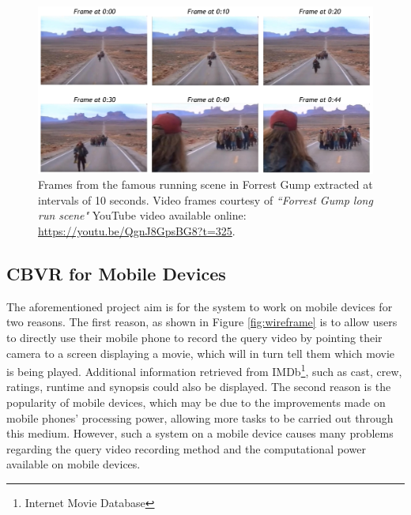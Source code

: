 \begin{figure}[h]
\centerline{\includegraphics[width=\textwidth]{figures/forrest_gump_shot.jpg}}
\caption{\label{fig:forrest_gump_frames}Frames from the famous running scene in Forrest Gump extracted at intervals of 10 seconds. Video frames courtesy of \textit{``Forrest Gump long run scene"} YouTube video available online: \url{https://youtu.be/QgnJ8GpsBG8?t=325}.}
\end{figure}

\subsection{CBVR for Mobile Devices}

The aforementioned project aim is for the system to work on mobile devices for two reasons. The first reason, as shown in Figure \ref{fig:wireframe} is to allow users to directly use their mobile phone to record the query video by pointing their camera to a screen displaying a movie, which will in turn tell them which movie is being played. Additional information retrieved from IMDb\footnote{Internet Movie Database}, such as cast, crew, ratings, runtime and synopsis could also be displayed. The second reason is the popularity of mobile devices, which may be due to the improvements made on mobile phones' processing power, allowing more tasks to be carried out through this medium. However, such a system on a mobile device causes many problems regarding the query video recording method and the computational power available on mobile devices.\\


